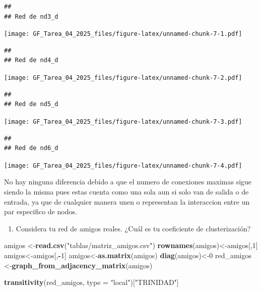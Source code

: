\documentclass[
]{article}
\newenvironment{Shaded}{\begin{snugshade}}{\end{snugshade}}
\newcommand{\AttributeTok}[1]{\textcolor[rgb]{0.13,0.29,0.53}{#1}}
\newcommand{\DecValTok}[1]{\textcolor[rgb]{0.00,0.00,0.81}{#1}}
\newcommand{\FunctionTok}[1]{\textcolor[rgb]{0.13,0.29,0.53}{\textbf{#1}}}
\newcommand{\NormalTok}[1]{#1}
\newcommand{\OtherTok}[1]{\textcolor[rgb]{0.56,0.35,0.01}{#1}}
\newcommand{\SpecialCharTok}[1]{\textcolor[rgb]{0.81,0.36,0.00}{\textbf{#1}}}
\newcommand{\StringTok}[1]{\textcolor[rgb]{0.31,0.60,0.02}{#1}}
\providecommand{\tightlist}{%
  \setlength{\itemsep}{0pt}\setlength{\parskip}{0pt}}
\begin{document}
\begin{verbatim}
## 
## Red de nd3_d
\end{verbatim}

\texttt{[image: GF\_Tarea\_04\_2025\_files/figure-latex/unnamed-chunk-7-1.pdf]}

\begin{verbatim}
## 
## Red de nd4_d
\end{verbatim}

\texttt{[image: GF\_Tarea\_04\_2025\_files/figure-latex/unnamed-chunk-7-2.pdf]}

\begin{verbatim}
## 
## Red de nd5_d
\end{verbatim}

\texttt{[image: GF\_Tarea\_04\_2025\_files/figure-latex/unnamed-chunk-7-3.pdf]}

\begin{verbatim}
## 
## Red de nd6_d
\end{verbatim}

\texttt{[image: GF\_Tarea\_04\_2025\_files/figure-latex/unnamed-chunk-7-4.pdf]}

No hay ninguna diferencia debido a que el numero de conexiones maximas
sigue siendo la misma pues estas cuenta como una sola aun si solo van de
salida o de entrada, ya que de cualquier manera unen o representan la
interaccion entre un par especifico de nodos.

\begin{enumerate}
\def\labelenumi{\arabic{enumi}.}
\setcounter{enumi}{3}
\tightlist
\item
  Considera tu red de amigos reales. ¿Cuál es tu coeficiente de
  clusterización?
\end{enumerate}

\begin{Shaded}
\begin{Highlighting}[]
\NormalTok{amigos }\OtherTok{\textless{}{-}}\FunctionTok{read.csv}\NormalTok{(}\StringTok{"tablas/matriz\_amigos.csv"}\NormalTok{)}
\FunctionTok{rownames}\NormalTok{(amigos)}\OtherTok{\textless{}{-}}\NormalTok{amigos[,}\DecValTok{1}\NormalTok{]}
\NormalTok{amigos}\OtherTok{\textless{}{-}}\NormalTok{amigos[,}\SpecialCharTok{{-}}\DecValTok{1}\NormalTok{]}
\NormalTok{amigos}\OtherTok{\textless{}{-}}\FunctionTok{as.matrix}\NormalTok{(amigos)}
\FunctionTok{diag}\NormalTok{(amigos)}\OtherTok{\textless{}{-}}\DecValTok{0}
\NormalTok{red\_amigos }\OtherTok{\textless{}{-}}\FunctionTok{graph\_from\_adjacency\_matrix}\NormalTok{(amigos)}

\FunctionTok{transitivity}\NormalTok{(red\_amigos, }\AttributeTok{type =} \StringTok{"local"}\NormalTok{)[}\StringTok{"TRINIDAD"}\NormalTok{]}
\end{Highlighting}
\end{Shaded}
\end{document}
